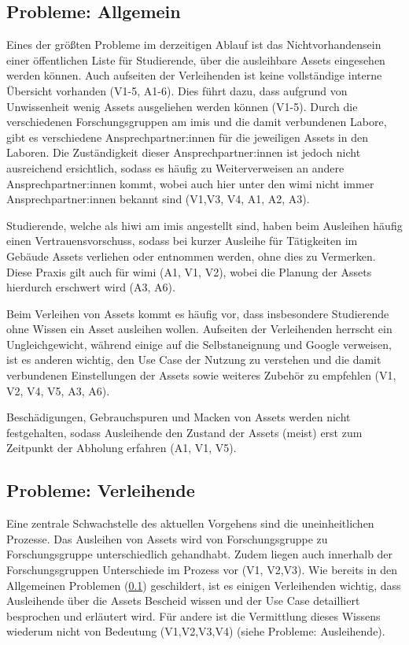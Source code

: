 \subsection{Probleme: Allgemein}
\label{section:probleme-allgemein}
Eines der größten Probleme im derzeitigen Ablauf ist das Nichtvorhandensein einer öffentlichen Liste
für Studierende, über die ausleihbare Assets eingesehen werden können. Auch aufseiten der
Verleihenden ist keine vollständige interne Übersicht vorhanden (V1-5, A1-6). Dies führt dazu, dass
aufgrund von Unwissenheit wenig Assets ausgeliehen werden können (V1-5). Durch die verschiedenen
Forschungsgruppen am \ac{imis} und die damit verbundenen Labore, gibt es verschiedene
Ansprechpartner:innen für die jeweiligen Assets in den Laboren. Die Zuständigkeit dieser
Ansprechpartner:innen ist jedoch nicht ausreichend ersichtlich, sodass es häufig zu Weiterverweisen
an andere Ansprechpartner:innen kommt, wobei auch hier unter den \ac{wimi} nicht immer
Ansprechpartner:innen bekannt sind (V1,V3, V4, A1, A2, A3).

Studierende, welche als \ac{hiwi} am \ac{imis} angestellt sind, haben beim Ausleihen häufig einen
Vertrauensvorschuss, sodass bei kurzer Ausleihe für Tätigkeiten im Gebäude Assets verliehen oder
entnommen werden, ohne dies zu Vermerken. Diese Praxis gilt auch für \ac{wimi} (A1, V1, V2), wobei
die Planung der Assets hierdurch erschwert wird (A3, A6).

Beim Verleihen von Assets kommt es häufig vor, dass insbesondere Studierende ohne Wissen  ein Asset ausleihen wollen. Aufseiten der Verleihenden herrscht ein
Ungleichgewicht, während einige auf die Selbstaneignung und Google verweisen, ist es anderen
wichtig, den Use Case der Nutzung zu verstehen und die damit verbundenen Einstellungen der Assets
sowie weiteres Zubehör zu empfehlen (V1, V2, V4, V5, A3, A6).

Beschädigungen, Gebrauchspuren und Macken von Assets werden nicht festgehalten, sodass Ausleihende
den Zustand der Assets (meist) erst zum Zeitpunkt der Abholung erfahren (A1, V1, V5).

\subsection{Probleme: Verleihende}
\label{section:probleme-verleihende}
Eine zentrale Schwachstelle des aktuellen Vorgehens sind die uneinheitlichen Prozesse. Das Ausleihen
von Assets wird von Forschungsgruppe zu Forschungsgruppe unterschiedlich gehandhabt. Zudem liegen
auch innerhalb der Forschungsgruppen Unterschiede im Prozess vor (V1, V2,V3). Wie bereits in den
Allgemeinen Problemen (\ref{section:probleme-allgemein}) geschildert, ist es einigen Verleihenden
wichtig, dass Ausleihende über die Assets Bescheid wissen und der Use Case detailliert besprochen
und erläutert wird. Für andere ist die Vermittlung dieses Wissens wiederum nicht von Bedeutung
(V1,V2,V3,V4) (siehe Probleme: Ausleihende).

